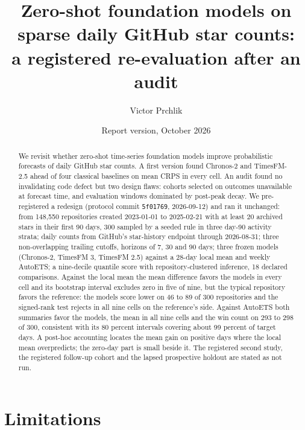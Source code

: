 \documentclass[10pt]{article}
\title{Zero-shot foundation models on sparse daily GitHub star counts:\\a registered re-evaluation after an audit}
\author{Victor Prchlik}
\date{Report version, October 2026 \\ \small \reportdoi}
\begin{document}
\sloppy
\maketitle

\begin{abstract}
We revisit whether zero-shot time-series foundation models improve probabilistic forecasts of daily GitHub
star counts. A first version found Chronos-2 and TimesFM-2.5 ahead of four classical baselines on mean CRPS
in every cell. An audit found no invalidating code defect but two design flaws: cohorts selected on outcomes
unavailable at forecast time, and evaluation windows dominated by post-peak decay. We pre-registered a
redesign (protocol commit \texttt{5f01769}, 2026-09-12) and ran it unchanged: from 148,550 repositories
created 2023-01-01 to 2025-02-21 with at least 20 archived stars in their first 90 days, 300 sampled by a
seeded rule in three day-90 activity strata; daily counts from GitHub's star-history endpoint through
2026-08-31; three non-overlapping trailing cutoffs, horizons of 7, 30 and 90 days; three frozen models
(Chronos-2, TimesFM 3, TimesFM 2.5) against a 28-day local mean and weekly AutoETS; a nine-decile quantile
score with repository-clustered inference, 18 declared comparisons. Against the local mean the mean
difference favors the models in every cell and its bootstrap interval excludes zero in five of nine, but the
typical repository favors the reference: the models score lower on 46 to 89 of 300 repositories and the
signed-rank test rejects in all nine cells on the reference's side. Against AutoETS both summaries favor the
models, the mean in all nine cells and the win count on 293 to 298 of 300, consistent with its 80 percent
intervals covering about 99 percent of target days. A post-hoc accounting locates the mean gain on positive
days where the local mean overpredicts; the zero-day part is small beside it. The registered second study,
the registered follow-up cohort and the lapsed prospective holdout are stated as not run.
\end{abstract}













\section{Limitations}
\end{document}

